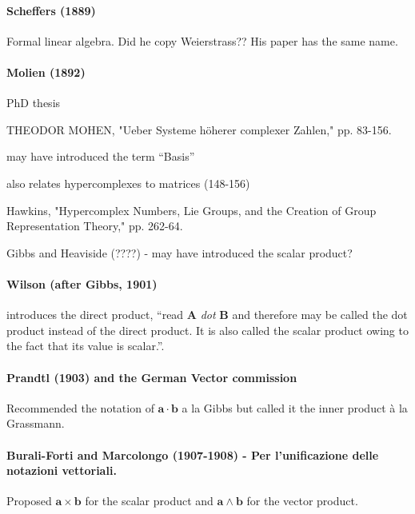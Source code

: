 \paragraph{Scheffers (1889)~\cite{Scheffers1889}}

Formal linear algebra. Did he copy Weierstrass?? His paper has the same name.


\paragraph{Molien (1892)}

PhD thesis

THEODOR MOHEN, "Ueber Systeme höherer complexer Zahlen," pp. 83-156.

may have introduced the term ``Basis''

also relates hypercomplexes to matrices (148-156)

Hawkins, "Hypercomplex Numbers, Lie Groups, and the
Creation of Group Representation Theory," pp. 262-64.

Gibbs and Heaviside (????) - may have introduced the scalar product?

\paragraph{Wilson (after Gibbs, 1901)}

\cite[p. 55]{Wilson1901} introduces the direct product, ``read \textbf{A} \textit{dot} \textbf{B} and therefore may be called the dot product instead of the direct product. It is also called the scalar product owing to the fact that its value is scalar.''.



\paragraph{Prandtl (1903) and the German Vector commission}

Recommended the notation of $\mathbf{a} \cdot \mathbf{b}$ a la Gibbs but called it the inner product à la Grassmann.

\paragraph{Burali-Forti and Marcolongo (1907-1908) - Per l’unificazione delle notazioni vettoriali.}

Proposed $\mathbf{a}\times\mathbf{b}$ for the scalar product and  $\mathbf{a}\wedge\mathbf{b}$ for the vector product.


